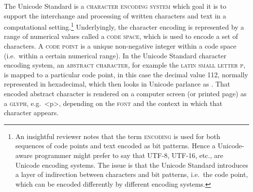 The Unicode Standard is a \textsc{character encoding system} which
goal it is to support the interchange and processing of written characters and
text in a computational setting.\footnote{An insightful reviewer notes that the term \textsc{encoding} is used for both sequences of code points and text encoded as bit patterns. Hence a Unicode-aware programmer might prefer to say that UTF-8, UTF-16, etc., are Unicode encoding systems. The issue is that the Unicode Standard introduces a layer of indirection between characters and bit patterns, i.e.\ the code point, which can be encoded differently by different encoding systems.} Underlyingly, the character encoding is
represented by a range of numerical values called a \textsc{code space}, which
is used to encode a set of characters. A \textsc{code point} is a unique
non-negative integer within a code space (i.e.~within a certain numerical
range). In the Unicode Standard character encoding system, an \textsc{abstract
character}, for example the \textsc{latin small letter p}, is mapped to a
particular code point, in this case the decimal value 112, normally represented in
hexadecimal, which then looks in Unicode parlance as
.
That encoded abstract character is rendered on a computer screen (or
printed page) as a \textsc{glyph}, e.g.\ <p>, depending on the \textsc{font} and
the context in which that character appears.

